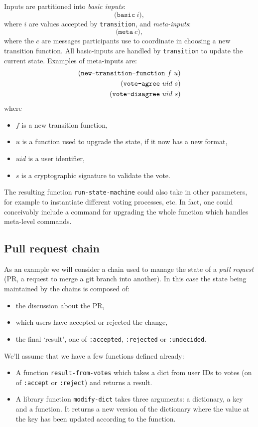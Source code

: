 Inputs are partitioned into \emph{basic inputs}:
\[
\mathtt{(basic} \ i),
\]
where $i$ are values accepted by \texttt{transition}, and \emph{meta-inputs}:
\[
\mathtt{(meta} \ c),
\]
where the $c$ are messages participants use to coordinate in choosing a new
transition function. All basic-inputs are handled by \texttt{transition}
to update the current state. Examples of meta-inputs are:
\begin{align*}
  (\text{\texttt{new-transition-function}} \ f \ u)\\
  (\text{\texttt{vote-agree}} \ uid \ s)\\
  (\text{\texttt{vote-disagree}} \ uid \ s)
\end{align*}
where
\begin{itemize}
\item $f$ is a new transition function,
\item $u$ is a function used to upgrade the state, if it now has a new format,
\item $uid$ is a user identifier,
\item $s$ is a cryptographic signature to validate the vote.
\end{itemize}
The resulting function \texttt{run-state-machine} could also take in other
parameters, for example to instantiate different voting processes, etc. In fact,
one could conceivably include a command for upgrading the whole function which
handles meta-level commands.

\subsection{Pull request chain}

As an example we will consider a chain used to manage the state of
a \emph{pull request} (PR, a request to merge a git branch into another). In this
case the state being maintained by the chains is composed of:
\begin{itemize}
  \item the discussion about the PR,
  \item which users have accepted or rejected the change,
  \item the final `result', one of \texttt{:accepted}, \texttt{:rejected} or
    \texttt{:undecided}.
\end{itemize}

We'll assume that we have a few functions defined already:
\begin{itemize}
  \item A function \texttt{result-from-votes} which takes a dict from user IDs
    to votes (on of \texttt{:accept} or \texttt{:reject}) and returns a result.
  \item A library function \texttt{modify-dict} takes three arguments: a
    dictionary, a key and a function. It returns a new version of the dictionary
    where the value at the key has been updated according to the function.
\end{itemize}


